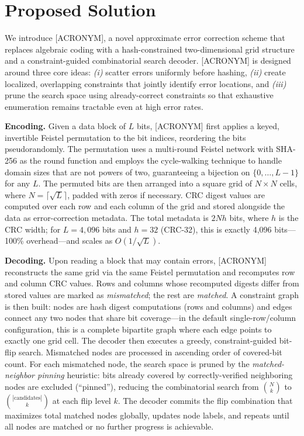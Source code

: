 \section*{Proposed Solution} \label{sec:solution}
\noindent

We introduce [ACRONYM], a novel approximate error correction scheme that replaces algebraic coding with a hash-constrained two-dimensional grid structure and a constraint-guided combinatorial search decoder. [ACRONYM] is designed around three core ideas: \emph{(i)} scatter errors uniformly before hashing, \emph{(ii)} create localized, overlapping constraints that jointly identify error locations, and \emph{(iii)} prune the search space using already-correct constraints so that exhaustive enumeration remains tractable even at high error rates.

\textbf{Encoding.} Given a data block of $L$ bits, [ACRONYM] first applies a keyed, invertible Feistel permutation to the bit indices, reordering the bits pseudorandomly. The permutation uses a multi-round Feistel network with SHA-256 as the round function and employs the cycle-walking technique to handle domain sizes that are not powers of two, guaranteeing a bijection on $\{0, \ldots, L-1\}$ for any $L$. The permuted bits are then arranged into a square grid of $N \times N$ cells, where $N = \lceil \sqrt{L} \rceil$, padded with zeros if necessary. CRC digest values are computed over each row and each column of the grid and stored alongside the data as error-correction metadata. The total metadata is $2Nh$ bits, where $h$ is the CRC width; for $L = 4{,}096$ bits and $h = 32$ (CRC-32), this is exactly 4,096 bits---100\% overhead---and scales as $O(1/\sqrt{L})$.

\textbf{Decoding.} Upon reading a block that may contain errors, [ACRONYM] reconstructs the same grid via the same Feistel permutation and recomputes row and column CRC values. Rows and columns whose recomputed digests differ from stored values are marked as \emph{mismatched}; the rest are \emph{matched}. A constraint graph is then built: nodes are hash digest computations (rows and columns) and edges connect any two nodes that share bit coverage---in the default single-row/column configuration, this is a complete bipartite graph where each edge points to exactly one grid cell. The decoder then executes a greedy, constraint-guided bit-flip search. Mismatched nodes are processed in ascending order of covered-bit count. For each mismatched node, the search space is pruned by the \emph{matched-neighbor pinning} heuristic: bits already covered by correctly-verified neighboring nodes are excluded (``pinned''), reducing the combinatorial search from $\binom{N}{k}$ to $\binom{|\text{candidates}|}{k}$ at each flip level $k$. The decoder commits the flip combination that maximizes total matched nodes globally, updates node labels, and repeats until all nodes are matched or no further progress is achievable.

